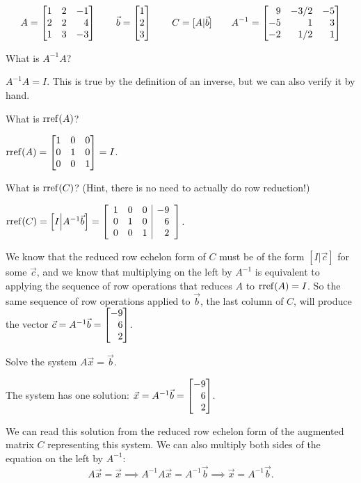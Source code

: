 	\[
		A=\mat{1&2&-1\\2&2&4\\1&3&-3}\qquad
		\vec b=\mat{1\\2\\3}\qquad
		C=[A|\vec b]\qquad
		A^{-1}=\mat{9&-3/2&-5\\-5&1&3\\-2&1/2&1}
	\]
	\begin{parts}
		\item What is $A^{-1}A$?
			\begin{solution}
				$A^{-1}A = I$. This is true by the definition of an inverse,
				but we can also verify it by hand.
			\end{solution}
		\item What is $\operatorname{rref}(A)$?
			\begin{solution}
				$\rref(A) = \mat{1&0&0\\0&1&0\\0&0&1} = I$.
			\end{solution}
		\item What is $\operatorname{rref}(C)$? (Hint, there is no need to actually do row reduction!)
			\begin{solution}
				$\operatorname{rref}(C) = \left[I\middle|A^{-1}\vec b\right]
				=\left[
					\begin{array}{rrr|r}
						1&0&0&-9\\
						0&1&0&6\\
						0&0&1&2
					\end{array}
				\right]$.

				We know that the reduced row echelon form of $C$ must be of the
				form $[I|\vec c]$ for some $\vec c$, and we know that multiplying
				on the left by $A^{-1}$ is equivalent to applying the sequence of
				row operations that reduces $A$ to $\operatorname{rref}(A)=I$. So the same sequence
				of row operations applied to $\vec b$, the last column of $C$,
				will produce the vector $\vec c=A^{-1}\vec b=\mat{-9\\6\\2}$.
			\end{solution}

		\item Solve the system $A\vec x=\vec b$.
			\begin{solution}
				The system has one solution: $\vec x=A^{-1}\vec b=\mat{-9\\6\\2}$.

				We can read this solution from the reduced row echelon form of the
				augmented matrix $C$ representing this system. We can also multiply
				both sides of the equation on the left by $A^{-1}$:
				\[
					A\vec x=\vec x
					\implies A^{-1}A\vec x=A^{-1}\vec b
					\implies \vec x=A^{-1}\vec b.
				\]
			\end{solution}
	\end{parts}

